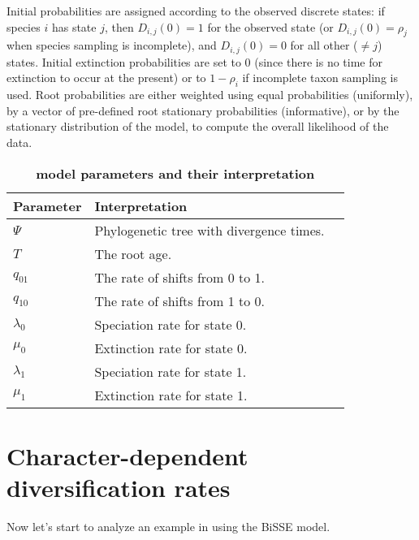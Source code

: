 Initial probabilities are assigned according to the observed discrete states: if species $i$ has state $j$, then $D_{i,j}(0) = 1$ for the observed state (or $D_{i,j}(0) = \rho_j$ when species sampling is incomplete), and $D_{i,j}(0) = 0$ for all other ($\neq j$) states.
Initial extinction probabilities are set to 0 (since there is no time for extinction to occur at the present) or to $1-\rho_i$ if incomplete taxon sampling is used. 
Root probabilities are either weighted using equal probabilities (uniformly), by a vector of pre-defined root stationary probabilities (informative), or by the stationary distribution of the model, to compute the overall likelihood of the data.


\begin{table}[t!]
	\centering
	\caption{\bf{\BiSSE model parameters and their interpretation}} \label{tab:param}
	\begin{tabular}{ l l l }
		\toprule
		Parameter & Interpretation \\
		\midrule
		$\Psi$ & Phylogenetic tree with divergence times.\\
		\rowcolor{gray!15} $T$ & The root age.\\
		$q_{01}$ & The rate of shifts from 0 to 1.\\
		\rowcolor{gray!15} $q_{10}$ & The rate of shifts from 1 to 0.\\
		$\lambda_0$ & Speciation rate for state 0.\\
		\rowcolor{gray!15} $\mu_0$ & Extinction rate for state 0.\\
		$\lambda_1$ & Speciation rate for state 1.\\
		\rowcolor{gray!15} $\mu_1$ & Extinction rate for state 1.\\
	\end{tabular}
\end{table}


\section{Character-dependent diversification rates}\label{sec:CDBDP}
Now let's start to analyze an example in \RevBayes using the BiSSE model.


